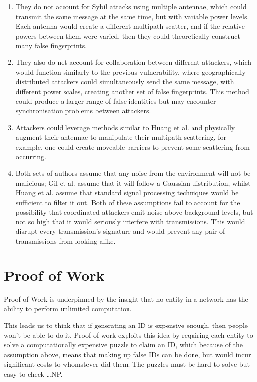 \begin{enumerate}
    \item They do not account for Sybil attacks using multiple antennae, which could transmit the same message at the same time, but with variable power levels. Each antenna would create a different multipath scatter, and if the relative powers between them were varied, then they could theoretically construct many false fingerprints.
    \item They also do not account for collaboration between different attackers, which would function similarly to the previous vulnerability, where geographically distributed attackers could simultaneously send the same message, with different power scales, creating another set of false fingerprints. This method could produce a larger range of false identities but may encounter synchronisation problems between attackers.
    \item Attackers could leverage methods similar to Huang et al. and physically augment their antennae to manipulate their multipath scattering, for example, one could create moveable barriers to prevent some scattering from occurring.
    \item Both sets of authors assume that any noise from the environment will not be malicious; Gil et al. assume that it will follow a Gaussian distribution, whilst Huang et al. assume that standard signal processing techniques would be sufficient to filter it out. Both of these assumptions fail to account for the possibility that coordinated attackers emit noise above background levels, but not so high that it would seriously interfere with transmissions. This would disrupt every transmission's signature and would prevent any pair of transmissions from looking alike.
\end{enumerate}



\section{Proof of Work}
Proof of Work is underpinned by the insight that no entity in a network has the ability to perform unlimited computation.

This leads us to think that if generating an ID is expensive enough, then people won't be able to do it. Proof of work exploits this idea by requiring each entity to solve a computationally expensive puzzle to claim an ID, which because of the assumption above, means that making up false IDs can be done, but would incur significant costs to whomstever did them. The puzzles must be hard to solve but easy to check \dots NP\citationneeded. 

